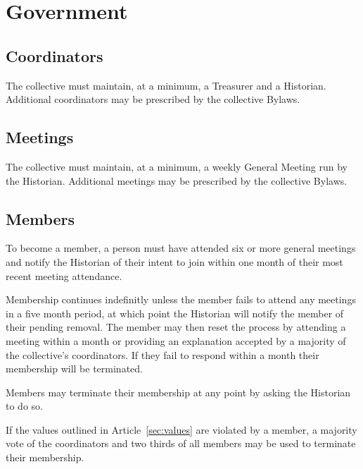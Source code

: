 \chapter{Government}

\section{Coordinators}\label{sec:coordinators}
The collective must maintain, at a minimum, a Treasurer and a Historian. Additional coordinators may be prescribed by the collective Bylaws.

\section{Meetings}\label{sec:meetings}
The collective must maintain, at a minimum, a weekly General Meeting run by the Historian. Additional meetings may be prescribed by the collective Bylaws.

\section{Members}\label{sec:members}
To become a member, a person must have attended six or more general meetings and notify the Historian of their intent to join within one month of their most recent meeting attendance.

Membership continues indefinitly unless the member fails to attend any meetings in a five month period, at which point the Historian will notify the member of their pending removal. The member may then reset the process by attending a meeting within a month or providing an explanation accepted by a majority of the collective's coordinators. If they fail to respond within a month their membership will be terminated.

Members may terminate their membership at any point by asking the Historian to do so.

If the values outlined in Article~\ref{sec:values} are violated by a member, a majority vote of the coordinators and two thirds of all members may be used to terminate their membership.
